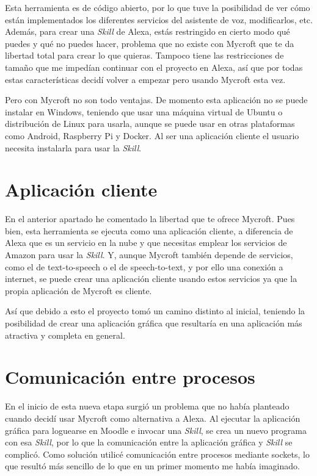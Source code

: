 Esta herramienta es de código abierto, por lo que tuve la posibilidad de ver cómo están implementados los diferentes servicios del asistente de voz, modificarlos, etc. Además, para crear una \textit{Skill} de Alexa, estás restringido en cierto modo qué puedes y qué no puedes hacer, problema que no existe con Mycroft que te da libertad total para crear lo que quieras. Tampoco tiene las restricciones de tamaño que me impedían continuar con el proyecto en Alexa, así que por todas estas características decidí volver a empezar pero usando Mycroft esta vez.

Pero con Mycroft no son todo ventajas. De momento esta aplicación no se puede instalar en Windows, teniendo que usar una máquina virtual de Ubuntu o distribución de Linux para usarla, aunque se puede usar en otras plataformas como Android, Raspberry Pi y Docker. Al ser una aplicación cliente el usuario necesita instalarla para usar la \textit{Skill}.

\section{Aplicación cliente}

En el anterior apartado he comentado la libertad que te ofrece Mycroft. Pues bien, esta herramienta se ejecuta como una aplicación cliente, a diferencia de Alexa que es un servicio en la nube y que necesitas emplear los servicios de Amazon para usar la \textit{Skill}. Y, aunque Mycroft también depende de servicios, como el de text-to-speech o el de speech-to-text, y por ello una conexión a internet, se puede crear una aplicación cliente usando estos servicios ya que la propia aplicación de Mycroft es cliente.

Así que debido a esto el proyecto tomó un camino distinto al inicial, teniendo la posibilidad de crear una aplicación gráfica que resultaría en una aplicación más atractiva y completa en general.

\section{Comunicación entre procesos}

En el inicio de esta nueva etapa surgió un problema que no había planteado cuando decidí usar Mycroft como alternativa a Alexa. Al ejecutar la aplicación gráfica para loguearse en Moodle e invocar una \textit{Skill}, se crea un nuevo programa con esa \textit{Skill}, por lo que la comunicación entre la aplicación gráfica y \textit{Skill} se complicó. Como solución utilicé comunicación entre procesos mediante sockets, lo que resultó más sencillo de lo que en un primer momento me había imaginado.

